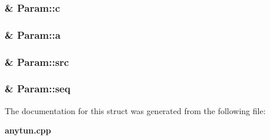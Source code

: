 \subsubsection{\& {\bf Param::c}}\label{structParam_4ef5a8757e2f89fcb1317a1969641149}


\subsubsection{\& {\bf Param::a}}\label{structParam_22172435ee2e6beb10acf92b2d68e40c}


\subsubsection{\& {\bf Param::src}}\label{structParam_fa5715cd7dc0833ea8f9afcbd1db455c}


\subsubsection{\& {\bf Param::seq}}\label{structParam_dc6a71f9fa352d3ecb312e2e33354f4e}




The documentation for this struct was generated from the following file:\begin{CompactItemize}
\item 
{\bf anytun.cpp}\end{CompactItemize}
